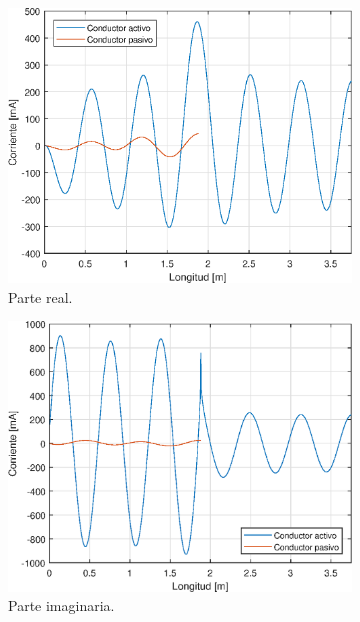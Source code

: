 \begin{figure}[H]
	\begin{subfigure}{0.5\textwidth}
		\includegraphics[scale=0.6]{imagenes/i_real_480_tierra.eps}
		\caption{Parte real.}
	\end{subfigure}
	\quad
	\begin{subfigure}{0.5\textwidth}
		\includegraphics[scale=0.6]{imagenes/i_imag_480_tierra.eps}
		\caption{Parte imaginaria.}
	\end{subfigure}
	\quad
	\begin{subfigure}{0.5\textwidth}

\end{subfigure}
\end{figure}
